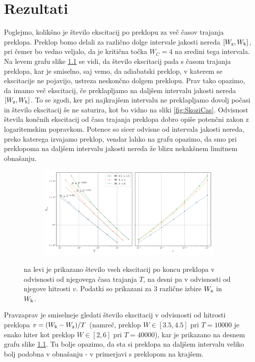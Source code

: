 \chapter{Rezultati}
Poglejmo, kolikšno je število ekscitacij po preklopu za več časov trajanja preklopa. Preklop bomo delali za različno dolge intervale jakosti nereda $[W_{\textup{z}}, W_{\textup{k}}]$, pri čemer bo vedno veljalo, da je kritična točka $W_C=4$ na sredini tega intervala. Na levem grafu slike \ref{fig:Skaliranje} se vidi, da število ekscitacij pada s časom trajanja preklopa, kar je smiselno, saj vemo, da adiabatski preklop, v katerem se ekscitacije ne pojavijo, ustreza neskončno dolgem preklopu.
Prav tako opazimo, da imamo več ekscitacij, če preklapljamo na daljšem intervalu jakosti nereda $[W_{\textup{z}}, W_{\textup{k}}]$. To se zgodi, ker pri najkrajšem intervalu ne preklapljamo dovolj počasi in število ekscitacij še ne saturira, kot bo vidno na sliki \ref{fig:SkoziCas}. Odvisnost števila končnih ekscitacij od časa trajanja preklopa dobro opiše potenčni zakon z logaritemskim popravkom. Potence so sicer odvisne od intervala jakosti nereda, preko katerega izvajamo preklop, vendar lahko na grafu opazimo, da smo pri preklopoma na daljšem intervalu jakosti nereda že blizu nekakšnem limitnem obnašanju. 
\begin{figure}[!h]
\centering
\begin{subfigure}{.99\textwidth}
\includegraphics[width=\linewidth]{Figures/Skaliranje3Alt.pdf}
\end{subfigure}
\caption{na levi je prikazano število vseh ekscitacij po koncu preklopa v odvisnosti od njegovega časa trajanja $T$, na desni pa v odvisnosti od njegove hitrosti $v$. Podatki so prikazani za 3 različne izbire $W_{\textup{z}}$ in $W_{\textup{k}}$.}
\label{fig:Skaliranje}
\end{figure}
Pravzaprav je smiselneje gledati število ekscitacij v odvisnosti od hitrosti preklopa $v=(W_{\textup{k}}-W_{\textup{z}})/T$ (namreč, preklop $W \in [3.5, 4.5]$ pri $T=10000$ je enako hiter kot preklop $W \in [2,6]$ pri $T=40000$), kar je prikazano na desnem grafu slike \ref{fig:Skaliranje}. Tu bolje opazimo, da sta si preklopa na daljšem intervalu veliko bolj podobna v obnašanju - v primerjavi s preklopom na krajšem. 
